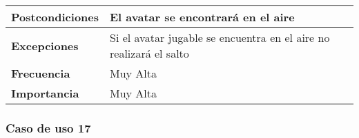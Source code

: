 \begin{tabularx}{\columnwidth}{l|l}
\begin{minipage}{0.25\columnwidth}
\textbf{Postcondiciones} 
\end{minipage}
&
\begin{minipage}{0.65\columnwidth}
El avatar se encontrará en el aire
\end{minipage}
\\ \hline

\begin{minipage}{0.25\columnwidth}
\textbf{Excepciones} 
\end{minipage}
&
\begin{minipage}{0.65\columnwidth}
Si el avatar jugable se encuentra en el aire no realizará el salto 
\end{minipage}
\\ \hline

\begin{minipage}{0.25\columnwidth}
\textbf{Frecuencia} 
\end{minipage}
&
\begin{minipage}{0.65\columnwidth}
Muy Alta
\end{minipage}
\\ \hline

\begin{minipage}{0.25\columnwidth}
\textbf{Importancia} 
\end{minipage}
&
\begin{minipage}{0.65\columnwidth}
Muy Alta
\end{minipage}
\\ \hline
\end{tabularx}

\subsubsection{Caso de uso 17}

